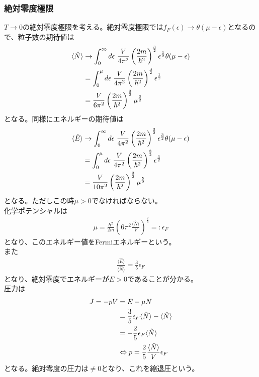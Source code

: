 \documentclass[dvipdfmx, 11pt, a4paper]{jsarticle}
\theoremstyle{definition}
\begin{document}
\subsubsection{絶対零度極限}
    $T \rightarrow 0$の絶対零度極限を考える。絶対零度極限では$f_F (\epsilon) \rightarrow \theta (\mu - \epsilon)$となるので、粒子数の期待値は
    \begin{align}
        \langle \hat{N} \rangle &\rightarrow \int_0^{\infty} d\epsilon\ \frac{V}{4 \pi^2} \left( \frac{2m}{\hbar^2} \right)^{\frac{3}{2}} \epsilon^\frac{1}{2} \theta (\mu - \epsilon) \notag \\
        &= \int_0^{\mu} d\epsilon\ \frac{V}{4 \pi^2} \left( \frac{2m}{\hbar^2} \right)^{\frac{3}{2}} \epsilon^\frac{1}{2} \notag \\
        &= \frac{V}{6 \pi^2} \left( \frac{2m}{\hbar^2} \right)^{\frac{3}{2}} \mu^\frac{3}{2}
    \end{align}
    となる。同様にエネルギーの期待値は
    \begin{align}
        \langle \hat{E} \rangle &\rightarrow \int_0^{\infty} d\epsilon\  \frac{V}{4 \pi^2} \left( \frac{2m}{\hbar^2} \right)^{\frac{3}{2}} \epsilon^\frac{3}{2} \theta (\mu - \epsilon) \notag \\
        &= \int_0^{\mu} d\epsilon\  \frac{V}{4 \pi^2} \left( \frac{2m}{\hbar^2} \right)^{\frac{3}{2}} \epsilon^\frac{3}{2} \notag \\
        &= \frac{V}{10 \pi^2} \left( \frac{2m}{\hbar^2} \right)^{\frac{3}{2}} \mu^\frac{5}{2} 
    \end{align}
    となる。ただしこの時$\mu > 0$でなければならない。\\
    化学ポテンシャルは
    \begin{align}
        \mu =  \frac{\hbar^2}{2m} \left( 6\pi^2 \frac{\langle\hat{N} \rangle}{V} \right)^\frac{2}{3} =: \epsilon_F 
    \end{align}
    となり、このエネルギー値をFermiエネルギーという。\\
    また
    \begin{align}
        \frac{\langle \hat{E} \rangle}{\langle \hat{N} \rangle } = \frac{3}{5} \epsilon_F
    \end{align}
    となり、絶対零度でエネルギーが$E>0$であることが分かる。\\
    圧力は
    \begin{align}
        J = -pV &= E - \mu N \notag \\
        &= \frac{3}{5} \epsilon_F \langle \hat{N} \rangle  - \langle \hat{N} \rangle \notag \\
        &= -\frac{2}{5} \epsilon_F \langle \hat{N} \rangle \notag \\
        &\Leftrightarrow p = \frac{2}{5} \frac{ \langle \hat{N} \rangle}{V} \epsilon_F
    \end{align}
    となる。絶対零度の圧力は$\ne 0 $となり、これを縮退圧という。
\end{document}
